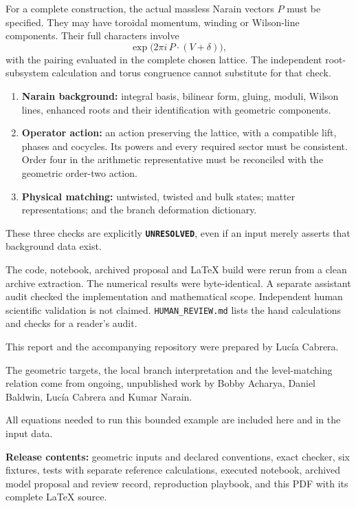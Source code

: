 \documentclass[10pt,a4paper]{article}
\newcommand{\sect}[1]{\vspace{7pt}{\fontsize{15}{18}\selectfont #1}\par\vspace{-4pt}{\color{bodyink}\rule{\linewidth}{0.35pt}}\par\vspace{-3pt}}
\newcommand{\subsect}[1]{\vspace{4pt}{\bfseries #1}\par\vspace{-3pt}}
\newcommand{\note}[1]{\par\vspace{4pt}\noindent\colorbox{pale}{\parbox{\dimexpr\linewidth-2\fboxsep\relax}{\small #1}}\par\vspace{4pt}}
\newcommand{\status}[1]{\texttt{\bfseries #1}}
\begin{document}
For a complete construction, the actual massless Narain vectors \(P\) must be specified. They may have toroidal momentum, winding or Wilson-line components. Their full characters involve
\[
\exp\bigl(2\pi i\,P\cdot(V+\delta)\bigr),
\]
with the pairing evaluated in the complete chosen lattice. The independent root-subsystem calculation and torus congruence cannot substitute for that check.

\begin{enumerate}
\item \textbf{Narain background:} integral basis, bilinear form, gluing, moduli, Wilson lines, enhanced roots and their identification with geometric components.
\item \textbf{Operator action:} an action preserving the lattice, with a compatible lift, phases and cocycles. Its powers and every required sector must be consistent. Order four in the arithmetic representative must be reconciled with the geometric order-two action.
\item \textbf{Physical matching:} untwisted, twisted and bulk states; matter representations; and the branch deformation dictionary.
\end{enumerate}
These three checks are explicitly \status{UNRESOLVED}, even if an input merely asserts that background data exist.

\subsect{Validation and scientific review}
The code, notebook, archived proposal and LaTeX build were rerun from a clean archive extraction. The numerical results were byte-identical. A separate assistant audit checked the implementation and mathematical scope. Independent human scientific validation is not claimed. \texttt{HUMAN\_REVIEW.md} lists the hand calculations and checks for a reader's audit.

\sect{Authorship and attribution}
\small
This report and the accompanying repository were prepared by Luc\'ia Cabrera.

The geometric targets, the local branch interpretation and the level-matching relation come from ongoing, unpublished work by Bobby Acharya, Daniel Baldwin, Luc\'ia Cabrera and Kumar Narain.

All equations needed to run this bounded example are included here and in the input data.

\note{\textbf{Release contents:} geometric inputs and declared conventions, exact checker, six fixtures, tests with separate reference calculations, executed notebook, archived model proposal and review record, reproduction playbook, and this PDF with its complete LaTeX source.}
\end{document}
